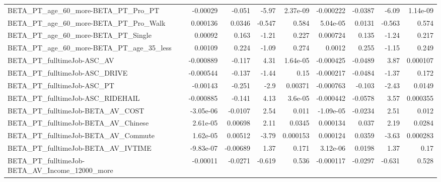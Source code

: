 \begin{tabular}{lrrrrrrrr}
BETA\_PT\_age\_60\_more-BETA\_PT\_Pro\_PT                 &    -0.00029 &       -0.051 &    -5.97 & 2.37e-09 &  -0.000222 &     -0.0387 &        -6.09 &      1.14e-09 \\
BETA\_PT\_age\_60\_more-BETA\_PT\_Pro\_Walk               &    0.000136 &       0.0346 &   -0.547 &    0.584 &   5.04e-05 &      0.0131 &       -0.563 &         0.574 \\
BETA\_PT\_age\_60\_more-BETA\_PT\_Single                 &     0.00092 &        0.163 &    -1.21 &    0.227 &   0.000724 &       0.135 &        -1.24 &         0.217 \\
BETA\_PT\_age\_60\_more-BETA\_PT\_age\_35\_less            &     0.00109 &        0.224 &    -1.09 &    0.274 &     0.0012 &       0.255 &        -1.15 &         0.249 \\
BETA\_PT\_fulltimeJob-ASC\_AV                         &   -0.000889 &       -0.117 &     4.31 & 1.64e-05 &  -0.000425 &     -0.0489 &         3.87 &      0.000107 \\
BETA\_PT\_fulltimeJob-ASC\_DRIVE                      &   -0.000544 &       -0.137 &    -1.44 &     0.15 &  -0.000217 &     -0.0484 &        -1.37 &         0.172 \\
BETA\_PT\_fulltimeJob-ASC\_PT                         &    -0.00143 &       -0.251 &     -2.9 &  0.00371 &  -0.000763 &      -0.103 &        -2.43 &        0.0149 \\
BETA\_PT\_fulltimeJob-ASC\_RIDEHAIL                   &   -0.000885 &       -0.141 &     4.13 &  3.6e-05 &  -0.000442 &     -0.0578 &         3.57 &      0.000355 \\
BETA\_PT\_fulltimeJob-BETA\_AV\_COST                   &   -3.05e-06 &      -0.0107 &     2.54 &    0.011 &  -1.09e-05 &     -0.0234 &         2.51 &         0.012 \\
BETA\_PT\_fulltimeJob-BETA\_AV\_Chinese                &    2.61e-05 &      0.00698 &     2.11 &   0.0345 &   0.000134 &       0.037 &         2.19 &        0.0284 \\
BETA\_PT\_fulltimeJob-BETA\_AV\_Commute                &    1.62e-05 &      0.00512 &    -3.79 & 0.000153 &   0.000124 &      0.0359 &        -3.63 &      0.000283 \\
BETA\_PT\_fulltimeJob-BETA\_AV\_IVTIME                 &   -9.83e-07 &     -0.00689 &     1.37 &    0.171 &   3.12e-06 &      0.0198 &         1.37 &          0.17 \\
BETA\_PT\_fulltimeJob-BETA\_AV\_Income\_12000\_more      &    -0.00011 &      -0.0271 &   -0.619 &    0.536 &  -0.000117 &     -0.0297 &       -0.631 &         0.528 \\

\end{tabular}

